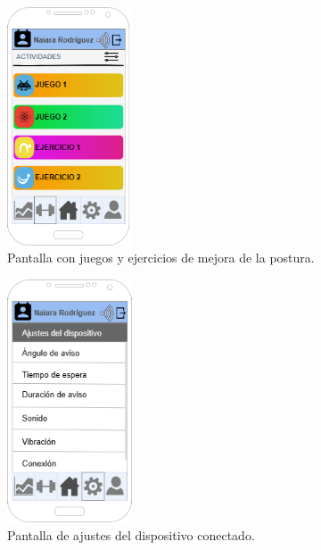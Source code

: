 \begin{figure}[h]
    \centering
    \includegraphics[width=0.33\textwidth]{img/Ejercicios.png}
    \caption{Pantalla con juegos y ejercicios de mejora de la postura.}
    \label{fig:ejercicios} %
\end{figure}

\begin{figure}[h]
    \centering
    \includegraphics[width=0.33\textwidth]{img/PantallaAjustes.png}
    \caption{Pantalla de ajustes del dispositivo conectado.}
    \label{fig:ajustes} %
\end{figure}

